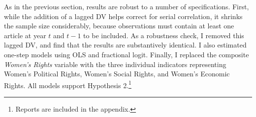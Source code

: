\documentclass[11pt, oneside]{article}
\begin{document}
As in the previous section, results are robust to a number of specifications. First, while the addition of a lagged DV helps correct for serial correlation, it shrinks the sample size considerably, because observations must contain at least one article at year $t$ and $t-1$ to be included. As a robustness check, I removed this lagged DV, and find that the results are substantively identical. I also estimated one-step models using OLS and fractional logit. Finally, I replaced the composite \emph{Women's Rights} variable with the three individual indicators representing Women's Political Rights, Women's Social Rights, and Women's Economic Rights. All models support Hypothesis 2.\footnote{Reports are included in the appendix.}


\newpage



\end{document}
